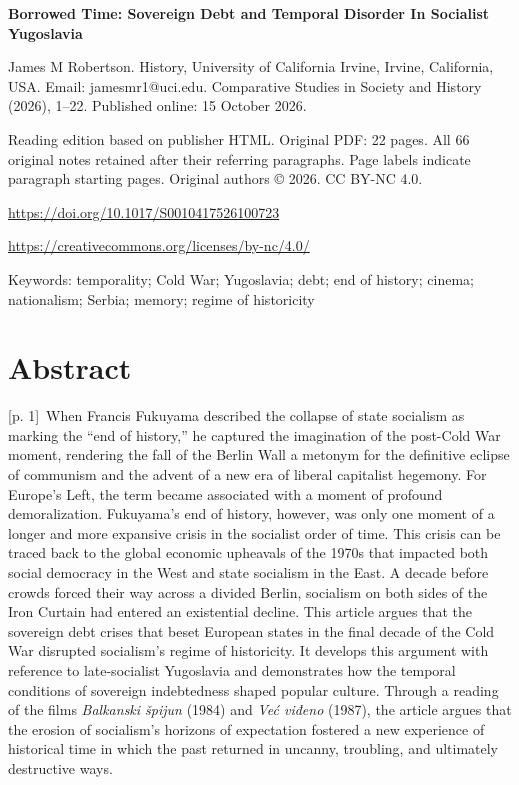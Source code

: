 \documentclass[10pt,a4paper]{article}
\begin{document}
{\Large\bfseries Borrowed Time: Sovereign Debt and Temporal Disorder In Socialist Yugoslavia\par}\medskip

James M Robertson. History, University of California Irvine, Irvine, California, USA. Email: jamesmr1@uci.edu. Comparative Studies in Society and History (2026), 1–22. Published online: 15 October 2026.\par
Reading edition based on publisher HTML. Original PDF: 22 pages. All 66 original notes retained after their referring paragraphs. Page labels indicate paragraph starting pages. Original authors © 2026. CC BY-NC 4.0.\par
\url{https://doi.org/10.1017/S0010417526100723}\par
\url{https://creativecommons.org/licenses/by-nc/4.0/}\par
Keywords: temporality; Cold War; Yugoslavia; debt; end of history; cinema; nationalism; Serbia; memory; regime of historicity\par\bigskip
{}\section*{Abstract}
{\scriptsize\color{gray} [p. 1]}\ When Francis Fukuyama described the collapse of state socialism as marking the “end of history,” he captured the imagination of the post-Cold War moment, rendering the fall of the Berlin Wall a metonym for the definitive eclipse of communism and the advent of a new era of liberal capitalist hegemony. For Europe’s Left, the term became associated with a moment of profound demoralization. Fukuyama’s end of history, however, was only one moment of a longer and more expansive crisis in the socialist order of time. This crisis can be traced back to the global economic upheavals of the 1970s that impacted both social democracy in the West and state socialism in the East. A decade before crowds forced their way across a divided Berlin, socialism on both sides of the Iron Curtain had entered an existential decline. This article argues that the sovereign debt crises that beset European states in the final decade of the Cold War disrupted socialism’s regime of historicity. It develops this argument with reference to late-socialist Yugoslavia and demonstrates how the temporal conditions of sovereign indebtedness shaped popular culture. Through a reading of the films \textit{Balkanski špijun} (1984) and \textit{Već viđeno} (1987), the article argues that the erosion of socialism’s horizons of expectation fostered a new experience of historical time in which the past returned in uncanny, troubling, and ultimately destructive ways.\par
\end{document}
